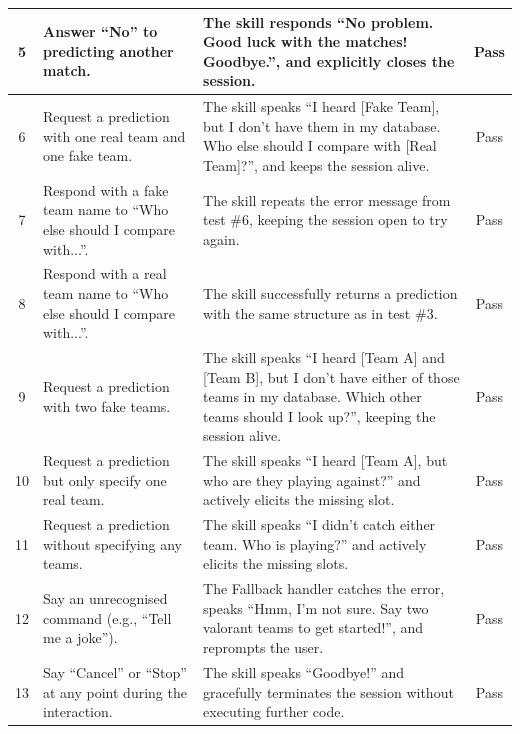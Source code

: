 {\begin{longtable}{@{} c >{\raggedright\arraybackslash}p{4.5cm} >{\raggedright\arraybackslash}p{6.5cm} c @{}}
    5 & Answer ``No'' to predicting another match. & The skill responds ``No problem. Good luck with the matches! Goodbye.'', and explicitly closes the session. & Pass \\
    \midrule
    
    6 & Request a prediction with one real team and one fake team. & The skill speaks ``I heard [Fake Team], but I don't have them in my database. Who else should I compare with [Real Team]?'', and keeps the session alive. & Pass \\
    \midrule
    
    7 & Respond with a fake team name to ``Who else should I compare with...''. & The skill repeats the error message from test \#6, keeping the session open to try again. & Pass \\
    \midrule
    
    8 & Respond with a real team name to ``Who else should I compare with...''. & The skill successfully returns a prediction with the same structure as in test \#3. & Pass \\
    \midrule
    
    9 & Request a prediction with two fake teams. & The skill speaks ``I heard [Team A] and [Team B], but I don't have either of those teams in my database. Which other teams should I look up?'', keeping the session alive. & Pass \\
    \midrule
    
    10 & Request a prediction but only specify one real team. & The skill speaks ``I heard [Team A], but who are they playing against?'' and actively elicits the missing slot. & Pass \\
    \midrule
    
    11 & Request a prediction without specifying any teams. & The skill speaks ``I didn't catch either team. Who is playing?'' and actively elicits the missing slots. & Pass \\
    \midrule
    
    12 & Say an unrecognised command (e.g., ``Tell me a joke''). & The Fallback handler catches the error, speaks ``Hmm, I'm not sure. Say two valorant teams to get started!'', and reprompts the user. & Pass \\
    \midrule
    
    13 & Say ``Cancel'' or ``Stop'' at any point during the interaction. & The skill speaks ``Goodbye!'' and gracefully terminates the session without executing further code. & Pass \\

\end{longtable}
}

